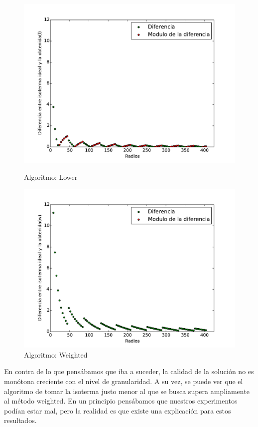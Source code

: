 \begin{figure}[h]
  \centering
  \begin{minipage}[b]{0.49\textwidth}
    \includegraphics[width=\textwidth]{graficos/mVariable_l.pdf}
    \caption{Algoritmo: Lower}
  \end{minipage}
  \hfill
  \begin{minipage}[b]{0.49\textwidth}
    \includegraphics[width=\textwidth]{graficos/mVariable_w.pdf}
    \caption{Algoritmo: Weighted}
  \end{minipage}
\end{figure}

En contra de lo que pensábamos que iba a suceder, la calidad de la solución no es monótona creciente con el nivel de granularidad. A su vez, se puede ver que el algoritmo de tomar la isoterma justo menor al que se busca supera ampliamente al método weighted. En un principio pensábamos que nuestros experimentos podían estar mal, pero la realidad es que existe una explicación para estos resultados.

